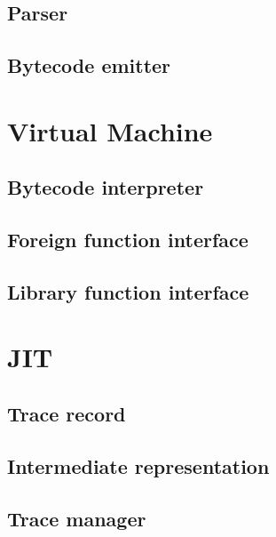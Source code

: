 \documentclass[12pt, oneside]{Thesis}
\begin{document}
  \chapter{Parser}
  \label{Chapt:Parser}

  \chapter{Bytecode emitter}
  \label{Chapt:BC}

\part{Virtual Machine}
\label{Part:VM}

  \chapter{Bytecode interpreter}
  \label{Chapt:BI}
  

  \chapter{Foreign function interface}
  \label{Chapt:FFI}

  \chapter{Library function interface}
  \label{Chapt:LFI}

\part{JIT}
\label{Part:JIT}

  \chapter{Trace record}
  \label{Chapt:TR}
  

  \chapter{Intermediate representation}
  \label{Chapt:IR}
  

  \chapter{Trace manager}
  \label{Chapt:TM}
  
\end{document}

